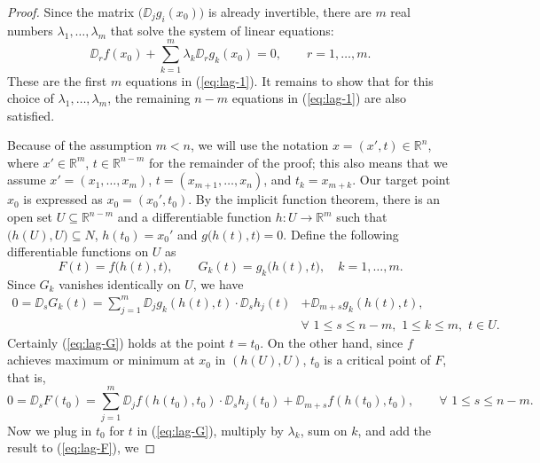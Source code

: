 \documentclass[11pt]{article}
\begin{document}
\begin{proof}
Since the matrix $\bigl( \DD_j g_i (x_0) \bigr)$ is already
invertible, there are $m$ real numbers $\lambda_1, \dots, \lambda_m$
that solve the system of linear equations:
\begin{equation}
  \label{eq:lag-3}
  \DD_r f(x_0) + \sum_{k = 1}^m \lambda_k \DD_r g_k(x_0) = 0, \qquad
  r = 1, \dots, m.
\end{equation}
These are the first $m$ equations in (\ref{eq:lag-1}).  It remains to
show that for this choice of $\lambda_1, \dots, \lambda_m$, the
remaining $n-m$ equations in (\ref{eq:lag-1}) are also satisfied.

Because of the assumption $m < n$, we will use the notation $x = (x',
t) \in \mathbb{R}^n$, where $x' \in \mathbb{R}^m$, $t \in \mathbb{R}^{n-m}$ for the
remainder of the proof; this also means that we assume $x' = (x_1,
\dots, x_m)$, $t = (x_{m+1}, \dots, x_n)$, and $t_k = x_{m+k}$.  Our
target point $x_0$ is expressed as $x_0 = (x_0', t_0)$.  By the
implicit function theorem, there is an open set $U \subseteq \mathbb{R}^{n-m}$ and a differentiable function $h : U \rightarrow \mathbb{R}^m$ such
that $\bigl(h(U), U\bigr) \subseteq N$, $h(t_0) = x_0'$ and $g\bigl( h(t), t
\bigr) = 0$.  Define the following differentiable functions on $U$ as
\begin{equation*}
  F(t) = f\bigl( h(t), t \bigr), \qquad G_k(t) = g_k \bigl( h(t), t
  \bigr), \quad k = 1, \dots, m.
\end{equation*}
Since $G_k$ vanishes identically on $U$, we have
\begin{equation}
  \label{eq:lag-G}
  \begin{split}
    0 = \DD_s G_k(t) = \sum_{j=1}^m \DD_j g_k( h(t), t ) \cdot \DD_s h_j (t) &+
    \DD_{m+s} g_k ( h(t), t ), \\ 
    &\forall \,\, 1 \leq s \leq n-m, \,\, 1 \leq k \leq m, \,\, t \in U.
  \end{split}
\end{equation} 
Certainly (\ref{eq:lag-G}) holds at the point $t = t_0$.  On the other
hand, since $f$ achieves maximum or minimum at $x_0$ in $(h(U), U)$,
$t_0$ is a critical point of $F$, that is,
\begin{equation}
  \label{eq:lag-F}
  0 = \DD_s F(t_0) = \sum_{j=1}^m \DD_j f( h(t_0), t_0 ) \cdot \DD_s h_j
  (t_0) + \DD_{m+s} f ( h(t_0), t_0 ), \qquad \forall \,\, 1 \leq s \leq n
  - m.
\end{equation}
Now we plug in $t_0$ for $t$ in (\ref{eq:lag-G}), multiply by
$\lambda_k$, sum on $k$, and add the result to (\ref{eq:lag-F}), we

\end{proof}
\end{document}
